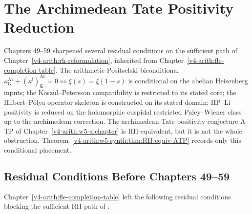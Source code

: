 \chapter{The Archimedean Tate Positivity Reduction}
\label{v4-arith:w5-synth:chapter}

Chapters 49--59 sharpened several residual conditions on the
sufficient path of
Chapter~\ref{v4-arith:rh-reformulation}, inherited from
Chapter~\ref{v4-arith:fle-completion-table}. The arithmetic
Positselski biconditional
\(\kappa^{\mathrm{Ar}}_{\mathsf{G}}+(\kappa^{!})^{\mathrm{Ar}}_{\mathsf{G}}=0
\Leftrightarrow \xi(s)=\xi(1-s)\)
is conditional on the abelian Heisenberg inputs; the
Koszul--Petersson compatibility is restricted to its stated core; the
Hilbert--P\'{o}lya operator skeleton is constructed on its stated
domain; HP--Li positivity is reduced on the holomorphic cuspidal
restricted Paley--Wiener class up to the archimedean correction.  The
archimedean Tate positivity conjecture A-TP of
Chapter~\ref{v4-arith:w5-a:chapter} is RH-equivalent, but it is not
the whole obstruction.
Theorem~\ref{v4-arith:w5-synth:thm:RH-equiv-ATP} records only this
conditional placement.

\section{Residual Conditions Before Chapters 49--59}
\label{v4-arith:w5-synth:domain}

Chapter~\ref{v4-arith:fle-completion-table} left the following
residual conditions blocking the sufficient RH path of
:

